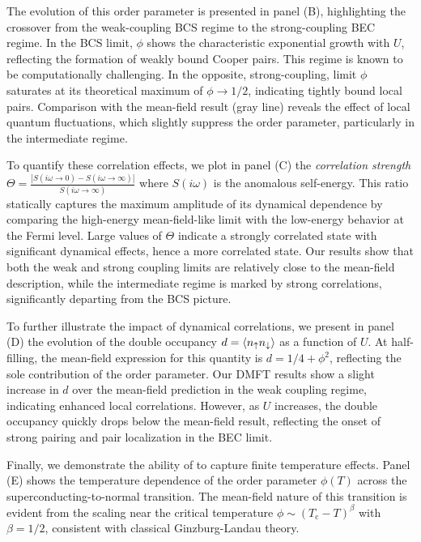 \documentclass[edipack2.tex]{subfiles}
\begin{document}
The evolution of this order parameter is presented in panel (B), 
highlighting the crossover from the weak-coupling BCS regime to the 
strong-coupling BEC regime. In the BCS limit, $\phi$ shows the 
characteristic exponential growth with $U$, reflecting the formation 
of weakly bound Cooper pairs. This regime is known to be 
computationally challenging. In the opposite, strong-coupling, limit 
$\phi$ saturates at its theoretical maximum of $\phi \rightarrow 1/2$, 
indicating tightly bound local pairs. Comparison with the mean-field result 
(gray line) reveals the effect of local quantum fluctuations, which 
slightly suppress the order parameter, particularly in the intermediate 
regime.



To quantify these correlation effects, we plot in panel (C) the 
\emph{correlation strength}
$\Theta=\frac{|S(i\omega\to 0)-S(i\omega\to\infty)|}{S(i\omega\to\infty)}$
where $S(i\omega)$ is the anomalous self-energy.
This ratio statically captures 
the maximum amplitude of its dynamical dependence by comparing the high-energy 
mean-field-like limit with the low-energy behavior at the Fermi level. 
Large values of $\Theta$ indicate a strongly correlated state with 
significant dynamical effects, hence a more correlated state.
Our results show that both the weak 
and strong coupling limits are relatively close to the mean-field 
description, while the intermediate regime is marked by strong 
correlations, significantly departing from the BCS picture.

To further illustrate the impact of dynamical correlations, we 
present in panel (D) the evolution of the double occupancy 
$d = \langle n_\uparrow n_\downarrow \rangle$ as a function of $U$. At half-filling, 
the mean-field expression for this quantity is $d = 1/4 + \phi^2$, 
reflecting the sole contribution of the order parameter. Our DMFT 
results show a slight increase in $d$ over the mean-field prediction 
in the weak coupling regime, indicating enhanced local correlations. 
However, as $U$ increases, the double occupancy quickly drops below 
the mean-field result, reflecting the onset of strong pairing and 
pair localization in the BEC limit.

Finally, we demonstrate the ability of \NAME to capture finite 
temperature effects. Panel (E) shows the temperature dependence of 
the order parameter $\phi(T)$ across the superconducting-to-normal 
transition. The mean-field nature of this transition is evident from 
the scaling near the critical temperature 
$\phi \sim (T_\mathrm{c} - T)^\beta$ with $\beta = 1/2$, consistent 
with classical Ginzburg-Landau theory.
\end{document}
